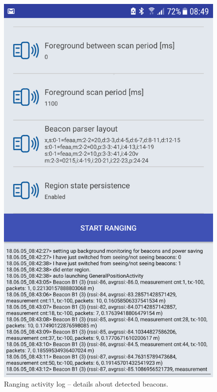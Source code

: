 \documentclass[../main.tex]{subfiles}
\begin{document}
\begin{figure}[!htbp]
\begin{minipage}{0.33\linewidth}
\includegraphics[width=\textwidth, clip]{pictures/app_beacon_ranging.png}
\caption{Ranging activity log -- details about detected beacons.}
\label{fig:app_beacon_ranging}
\end{minipage}
\end{figure}
\end{document}

